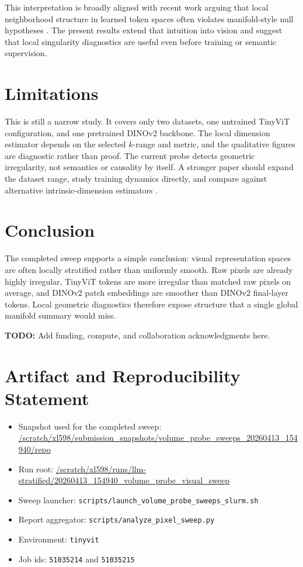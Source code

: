 \documentclass{article}
\newcommand{\TODO}[1]{\textcolor{red!70!black}{\textbf{TODO:} #1}}
\begin{document}
This interpretation is broadly aligned with recent work arguing that local neighborhood structure in learned token spaces often violates manifold-style null hypotheses \citep{robinson2025token}. The present results extend that intuition into vision and suggest that local singularity diagnostics are useful even before training or semantic supervision.

\section{Limitations}
This is still a narrow study. It covers only two datasets, one untrained TinyViT configuration, and one pretrained DINOv2 backbone. The local dimension estimator depends on the selected $k$-range and metric, and the qualitative figures are diagnostic rather than proof. The current probe detects geometric irregularity, not semantics or causality by itself. A stronger paper should expand the dataset range, study training dynamics directly, and compare against alternative intrinsic-dimension estimators \citep{facco2017estimating}.

\section{Conclusion}
The completed sweep supports a simple conclusion: visual representation spaces are often locally stratified rather than uniformly smooth. Raw pixels are already highly irregular, TinyViT tokens are more irregular than matched raw pixels on average, and DINOv2 patch embeddings are smoother than DINOv2 final-layer tokens. Local geometric diagnostics therefore expose structure that a single global manifold summary would miss.

\begin{ack}
\TODO{Add funding, compute, and collaboration acknowledgments here.}
\end{ack}




\appendix

\section{Artifact and Reproducibility Statement}
\begin{itemize}[leftmargin=1.5em]
\item Snapshot used for the completed sweep: \url{/scratch/xl598/submission_snapshots/volume_probe_sweeps_20260413_154940/repo}
\item Run root: \url{/scratch/xl598/runs/llm-stratified/20260413_154940_volume_probe_visual_sweep}
\item Sweep launcher: \texttt{scripts/launch\_volume\_probe\_sweeps\_slurm.sh}
\item Report aggregator: \texttt{scripts/analyze\_pixel\_sweep.py}
\item Environment: \texttt{tinyvit}
\item Job ids: \texttt{51035214} and \texttt{51035215}
\end{itemize}
\end{document}
